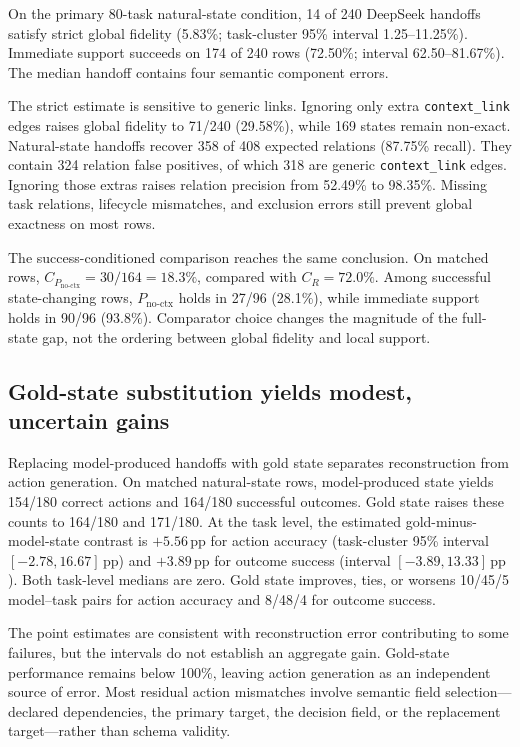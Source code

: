 \documentclass[11pt]{article}
\newcommand{\Rsupport}{R}
\newcommand{\Pnoctx}{P_{\mathrm{no\mbox{-}ctx}}}
\newcommand{\pp}{\,\mathrm{pp}}
\begin{document}
On the primary 80-task natural-state condition, 14 of 240 DeepSeek handoffs satisfy strict global fidelity (5.83\%; task-cluster 95\% interval 1.25--11.25\%). Immediate support succeeds on 174 of 240 rows (72.50\%; interval 62.50--81.67\%). The median handoff contains four semantic component errors.

The strict estimate is sensitive to generic links. Ignoring only extra \texttt{context\_link} edges raises global fidelity to 71/240 (29.58\%), while 169 states remain non-exact. Natural-state handoffs recover 358 of 408 expected relations (87.75\% recall). They contain 324 relation false positives, of which 318 are generic \texttt{context\_link} edges. Ignoring those extras raises relation precision from 52.49\% to 98.35\%. Missing task relations, lifecycle mismatches, and exclusion errors still prevent global exactness on most rows.

The success-conditioned comparison reaches the same conclusion. On matched rows, \(C_{\Pnoctx}=30/164=18.3\%\), compared with \(C_{\Rsupport}=72.0\%\). Among successful state-changing rows, \(\Pnoctx\) holds in 27/96 (28.1\%), while immediate support holds in 90/96 (93.8\%). Comparator choice changes the magnitude of the full-state gap, not the ordering between global fidelity and local support.

\subsection{Gold-state substitution yields modest, uncertain gains}

Replacing model-produced handoffs with gold state separates reconstruction from action generation. On matched natural-state rows, model-produced state yields 154/180 correct actions and 164/180 successful outcomes. Gold state raises these counts to 164/180 and 171/180. At the task level, the estimated gold-minus-model-state contrast is \(+5.56\pp\) for action accuracy (task-cluster 95\% interval \([-2.78,16.67]\pp\)) and \(+3.89\pp\) for outcome success (interval \([-3.89,13.33]\pp\)). Both task-level medians are zero. Gold state improves, ties, or worsens 10/45/5 model--task pairs for action accuracy and 8/48/4 for outcome success.

The point estimates are consistent with reconstruction error contributing to some failures, but the intervals do not establish an aggregate gain. Gold-state performance remains below 100\%, leaving action generation as an independent source of error. Most residual action mismatches involve semantic field selection---declared dependencies, the primary target, the decision field, or the replacement target---rather than schema validity.
\end{document}
